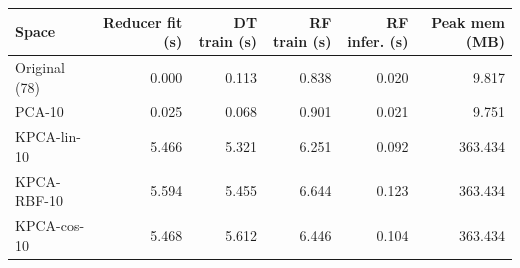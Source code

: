 \begin{tabular}{lrrrrr}
\toprule
Space & Reducer fit (s) & DT train (s) & RF train (s) & RF infer. (s) & Peak mem (MB) \\
\midrule
Original (78) & 0.000 & 0.113 & 0.838 & 0.020 & 9.817 \\
PCA-10 & 0.025 & 0.068 & 0.901 & 0.021 & 9.751 \\
KPCA-lin-10 & 5.466 & 5.321 & 6.251 & 0.092 & 363.434 \\
KPCA-RBF-10 & 5.594 & 5.455 & 6.644 & 0.123 & 363.434 \\
KPCA-cos-10 & 5.468 & 5.612 & 6.446 & 0.104 & 363.434 \\
\bottomrule
\end{tabular}
